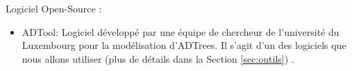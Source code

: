         Logiciel Open-Source :
        \begin{itemize}
        	\item ADTool: Logiciel développé par une équipe de chercheur de l'université du Luxembourg pour la modélisation d'ADTrees. Il s'agit d'un des logiciels que nous allons utiliser (plus de détails dans la Section \ref{sec:outils}) \cite{ADTool}.
        \end{itemize}

            


